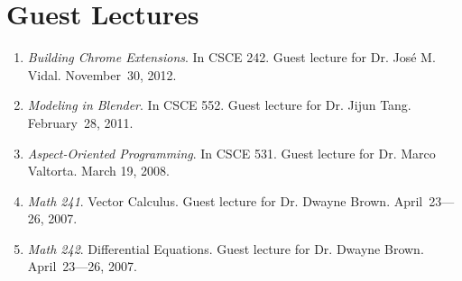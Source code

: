 \documentclass[10pt]{article}
\begin{document}
\section{Guest Lectures}
\begin{enumerate}
\renewcommand{\labelenumi}{[G\arabic{enumi}] }
\item \emph{Building Chrome Extensions}.  In CSCE 242.  Guest lecture for Dr. José M. Vidal.  November~30, 2012.
\item \emph{Modeling in Blender}.  In CSCE 552.  Guest lecture for Dr. Jijun Tang.  February~28, 2011.
\item \emph{Aspect-Oriented Programming}. In CSCE 531. Guest lecture for Dr. Marco Valtorta. March 19, 2008.
\item \emph{Math 241}. Vector Calculus. Guest lecture for Dr. Dwayne Brown. April~23---26, 2007. 
\item \emph{Math 242}. Differential Equations. Guest lecture for Dr. Dwayne Brown. April~23---26, 2007. 
\end{enumerate}

\end{document}
